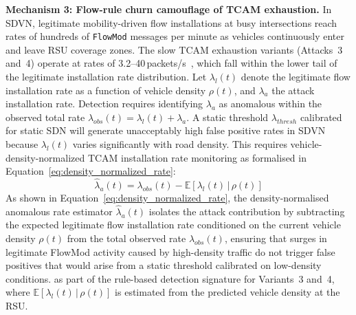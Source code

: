 \documentclass[12pt, a4paper]{report}
\begin{document}
\textbf{Mechanism 3: Flow-rule churn camouflage of TCAM exhaustion.}
In SDVN, legitimate mobility-driven flow installations at busy
intersections reach rates of hundreds of \texttt{FlowMod} messages
per minute as vehicles continuously enter and leave RSU coverage
zones. The slow TCAM exhaustion variants (Attacks~3 and~4) operate
at rates of 3.2--40\,packets/s~\cite{Pascoal2017}, which fall within
the lower tail of the legitimate installation rate distribution. Let
$\lambda_l(t)$ denote the legitimate flow installation rate as a
function of vehicle density $\rho(t)$, and $\lambda_a$ the attack
installation rate. Detection requires identifying $\lambda_a$ as
anomalous within the observed total rate $\lambda_{obs}(t) =
\lambda_l(t) + \lambda_a$. A static threshold $\lambda_{thresh}$
calibrated for static SDN will generate unacceptably high false
positive rates in SDVN because $\lambda_l(t)$ varies significantly
with road density. This requires vehicle-density-normalized TCAM
installation rate monitoring as formalised in
Equation~\eqref{eq:density_normalized_rate}:
\begin{equation}
\hat{\lambda}_a(t) = \lambda_{obs}(t) - \mathbb{E}\left[\lambda_l(t)\,|\,\rho(t)\right]
\label{eq:density_normalized_rate}
\end{equation}
As shown in Equation~\eqref{eq:density_normalized_rate}, the
density-normalised anomalous rate estimator $\hat{\lambda}_a(t)$
isolates the attack contribution by subtracting the expected
legitimate flow installation rate conditioned on the current vehicle
density $\rho(t)$ from the total observed rate $\lambda_{obs}(t)$,
ensuring that surges in legitimate FlowMod activity caused by
high-density traffic do not trigger false positives that would arise
from a static threshold calibrated on low-density conditions.
as part of the rule-based detection signature for Variants~3 and~4,
where $\mathbb{E}[\lambda_l(t)\,|\,\rho(t)]$ is estimated from the
predicted vehicle density at the RSU.
\end{document}
